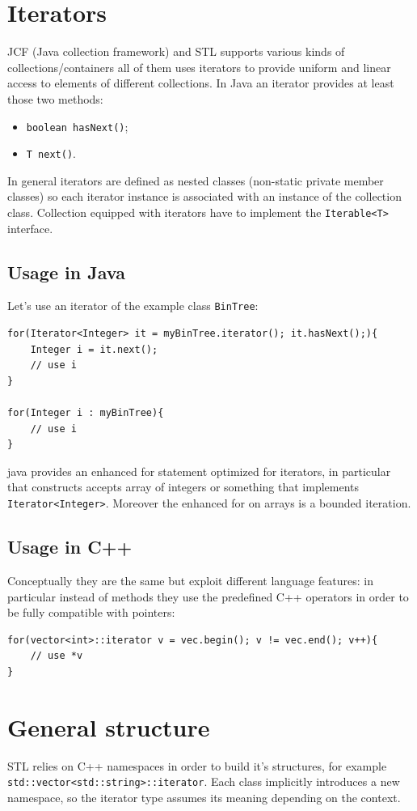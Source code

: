 \section{Iterators}
JCF (Java collection framework) and STL supports various kinds of collections/containers all of them uses iterators to provide uniform and linear access to elements of different collections.
In Java an iterator provides at least those two methods:
\begin{itemize}
    \item \verb|boolean hasNext()|;
    \item \verb|T next()|.
\end{itemize}

In general iterators are defined as nested classes (non-static private member classes) so each iterator instance is associated with an instance of the collection class.
Collection equipped with iterators have to implement the \verb|Iterable<T>| interface.

\subsection{Usage in Java}
Let's use an iterator of the example class \verb|BinTree|:
\begin{verbatim}
for(Iterator<Integer> it = myBinTree.iterator(); it.hasNext();){
    Integer i = it.next();
    // use i
}

for(Integer i : myBinTree){
    // use i
}
\end{verbatim}
java provides an enhanced for statement optimized for iterators, in particular that constructs accepts array of integers or something that implements \verb|Iterator<Integer>|.
Moreover the enhanced for on arrays is a bounded iteration.

\subsection{Usage in C++}
Conceptually they are the same but exploit different language features: in particular instead of methods they use the predefined C++ operators in order to be fully compatible with pointers:
\begin{verbatim}
for(vector<int>::iterator v = vec.begin(); v != vec.end(); v++){
    // use *v 
}
\end{verbatim}

\section{General structure}
STL relies on C++ namespaces in order to build it's structures, for example \\
\verb|std::vector<std::string>::iterator|.
Each class implicitly introduces a new namespace, so the iterator type assumes its meaning depending on the context.

